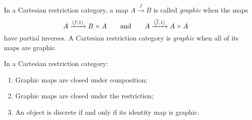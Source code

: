 In a Cartesian restriction category, a map $A\xrightarrow{f}B$ is
called \emph{graphic} when the maps
\[
  A\xrightarrow{\langle f,1\rangle}B\times A\qquad \text{and}\qquad
  A\xrightarrow{\langle\overline{f},1\rangle}A\times A
\]
have partial inverses. A Cartesian restriction category is \emph{graphic} when all of its maps
are graphic.
\begin{lemma}\label{lem:graphic_maps_are_closed_in_a_cartesian_restriction_category}
  In a Cartesian restriction category:
  \begin{enumerate}[{(}i{)}]
    \item Graphic maps are closed under composition;
    \item Graphic maps are closed under the restriction;
    \item An object is discrete if and only if its identity map is graphic.
  \end{enumerate}
\end{lemma}
